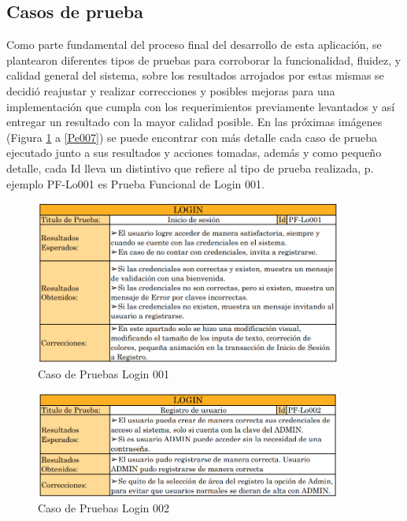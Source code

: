 \documentclass[12pt,letterpaper,spanish]{report}
\begin{document}
\subsection{Casos de prueba}
Como parte fundamental del proceso final del desarrollo de esta aplicación, se plantearon diferentes tipos de pruebas para corroborar la funcionalidad, fluidez, y calidad general del sistema, sobre los resultados arrojados por estas mismas se decidió reajustar y realizar correcciones y posibles mejoras para una implementación que cumpla con los requerimientos previamente levantados y así entregar un resultado con la mayor calidad posible.
En las próximas imágenes (Figura \ref{Lo001} a \ref{Pe007}) se puede encontrar con más detalle cada caso de prueba ejecutado junto a sus resultados y acciones tomadas, además y como pequeño detalle, cada Id lleva un distintivo que refiere al tipo de prueba realizada, p. ejemplo PF-Lo001 es Prueba Funcional de Login 001.


\newpage

\begin{figure}[H]
  \centering
  \includegraphics[width=0.9\textwidth]{PF-Lo001.png}
  \caption{Caso de Pruebas Login 001}\label{Lo001}
\end{figure}

\begin{figure}[H]
  \centering
  \includegraphics[width=0.9\textwidth]{PF-Lo002.png}
  \caption{Caso de Pruebas Login 002}\label{Lo002}
\end{figure}
\end{document}
